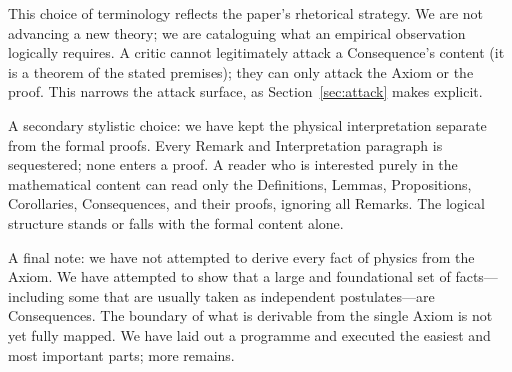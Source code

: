 \documentclass[11pt,twocolumn,a4paper]{article}
\theoremstyle{axiomstyle}
\theoremstyle{conseqstyle}
\theoremstyle{definition}
\theoremstyle{remark}
\begin{document}
This choice of terminology reflects the paper's rhetorical strategy. We are not advancing a new theory; we are cataloguing what an empirical observation logically requires. A critic cannot legitimately attack a Consequence's content (it is a theorem of the stated premises); they can only attack the Axiom or the proof. This narrows the attack surface, as Section~\ref{sec:attack} makes explicit.

A secondary stylistic choice: we have kept the physical interpretation separate from the formal proofs. Every Remark and Interpretation paragraph is sequestered; none enters a proof. A reader who is interested purely in the mathematical content can read only the Definitions, Lemmas, Propositions, Corollaries, Consequences, and their proofs, ignoring all Remarks. The logical structure stands or falls with the formal content alone.

A final note: we have not attempted to derive every fact of physics from the Axiom. We have attempted to show that a large and foundational set of facts---including some that are usually taken as independent postulates---are Consequences. The boundary of what is derivable from the single Axiom is not yet fully mapped. We have laid out a programme and executed the easiest and most important parts; more remains.


\end{document}
